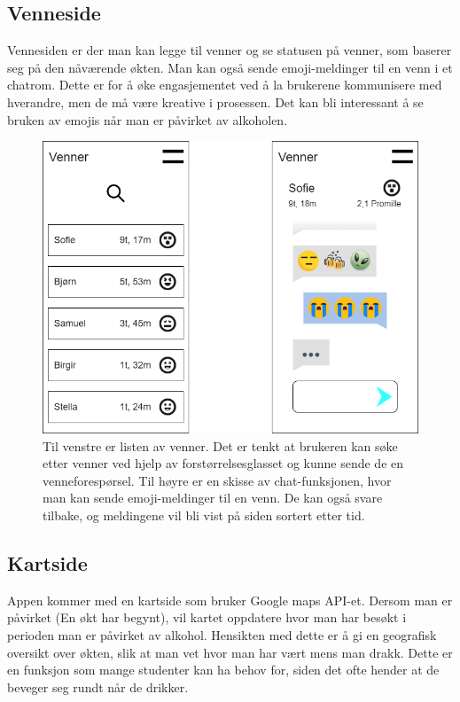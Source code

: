 \documentclass[12pt]{article}
\begin{document}
\subsection{Venneside}
Vennesiden er der man kan legge til venner og se statusen på venner, som baserer seg på den nåværende økten. Man kan også sende emoji-meldinger til en venn i et chatrom. Dette er for å øke engasjementet ved å la brukerene kommunisere med hverandre, men de må være kreative i prosessen. Det kan bli interessant å se bruken av emojis når man er påvirket av alkoholen. 

\begin{figure}[H]
    \centering
    \includegraphics[scale=0.4]{images/lille_promille_friends.drawio.png}
    \caption{Til venstre er listen av venner. Det er tenkt at brukeren kan søke etter venner ved hjelp av forstørrelsesglasset og kunne sende de en venneforespørsel. Til høyre er en skisse av chat-funksjonen, hvor man kan sende emoji-meldinger til en venn. De kan også svare tilbake, og meldingene vil bli vist på siden sortert etter tid.}
\end{figure}

\subsection{Kartside}
Appen kommer med en kartside som bruker Google maps API-et. Dersom man er påvirket (En økt har begynt), vil kartet oppdatere hvor man har besøkt i perioden man er påvirket av alkohol. Hensikten med dette er å gi en geografisk oversikt over økten, slik at man vet hvor man har vært mens man drakk. Dette er en funksjon som mange studenter kan ha behov for, siden det ofte hender at de beveger seg rundt når de drikker.
\end{document}
